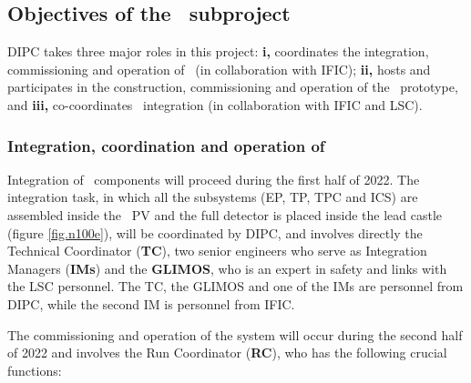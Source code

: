 \subsection{Objectives of the \sDIPC\ subproject}
\label{sec.obj.dipc}

DIPC takes three major roles in this project: {\bf i,} coordinates the integration, commissioning and operation of \Next\ (in collaboration with IFIC); 
{\bf ii,} hosts and participates in the construction, commissioning and operation of the \HDEMO\ prototype, and 
{\bf iii,} co-coordinates \NHD\ integration (in collaboration with IFIC and LSC). 

   
\subsubsection*{Integration, coordination and operation of \Next}


%

Integration of \Next\ components will proceed during the first half of 2022. The integration task, in which all the subsystems (EP, TP, TPC and ICS) are assembled inside the \Next\ PV and the full detector is placed inside the lead castle (figure \ref{fig.n100e}), will be coordinated by DIPC, and involves directly the Technical Coordinator ({\bf TC}), two senior engineers who serve as Integration Managers ({\bf IMs}) and the {\bf GLIMOS}, who is an expert in safety and links with the LSC personnel. The TC, the GLIMOS and one of the IMs are personnel from DIPC, while the second IM is personnel from IFIC. 

The commissioning and operation of the system will occur during the second half of 2022 and involves the Run Coordinator ({\bf RC}), who has the following crucial functions: 



